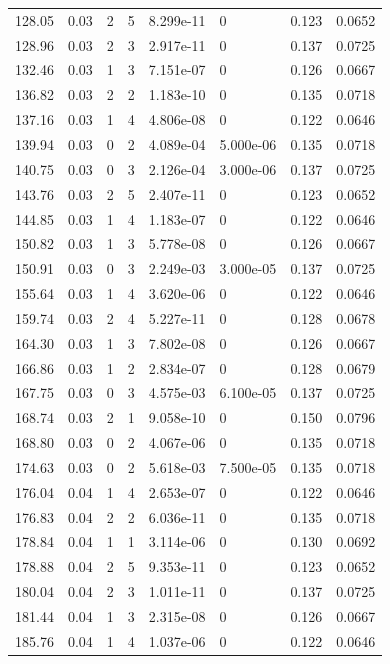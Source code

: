 \documentclass[preview]{standalone}
\begin{document}
{{{\begin{tabular}{L{1.2cm}C{1.2cm} C{0.3cm}C{0.5cm} C{1.4cm}C{1.4cm} C{1.4cm}C{1.4cm}}
  128.05  &  0.03  & 2     &  5 &  8.299e-11  & 0  & 0.123 &  0.0652   \\ 
  128.96  &  0.03  & 2     &  3 &  2.917e-11  & 0  & 0.137 &  0.0725   \\ 
  132.46  &  0.03  & 1     &  3 &  7.151e-07  & 0  & 0.126 &  0.0667   \\ 
  136.82  &  0.03  & 2     &  2 &  1.183e-10  & 0  & 0.135 &  0.0718   \\ 
  137.16  &  0.03  & 1     &  4 &  4.806e-08  & 0  & 0.122 &  0.0646   \\ 
  139.94  &  0.03  & 0     &  2 &  4.089e-04  & 5.000e-06  & 0.135 &  0.0718   \\ 
  140.75  &  0.03  & 0     &  3 &  2.126e-04  & 3.000e-06  & 0.137 &  0.0725   \\ 
  143.76  &  0.03  & 2     &  5 &  2.407e-11  & 0  & 0.123 &  0.0652   \\ 
  144.85  &  0.03  & 1     &  4 &  1.183e-07  & 0  & 0.122 &  0.0646   \\ 
  150.82  &  0.03  & 1     &  3 &  5.778e-08  & 0  & 0.126 &  0.0667   \\ 
  150.91  &  0.03  & 0     &  3 &  2.249e-03  & 3.000e-05  & 0.137 &  0.0725   \\ 
  155.64  &  0.03  & 1     &  4 &  3.620e-06  & 0  & 0.122 &  0.0646   \\ 
  159.74  &  0.03  & 2     &  4 &  5.227e-11  & 0  & 0.128 &  0.0678   \\ 
  164.30  &  0.03  & 1     &  3 &  7.802e-08  & 0  & 0.126 &  0.0667   \\ 
  166.86  &  0.03  & 1     &  2 &  2.834e-07  & 0  & 0.128 &  0.0679   \\ 
  167.75  &  0.03  & 0     &  3 &  4.575e-03  & 6.100e-05  & 0.137 &  0.0725   \\ 
  168.74  &  0.03  & 2     &  1 &  9.058e-10  & 0  & 0.150 &  0.0796   \\ 
  168.80  &  0.03  & 0     &  2 &  4.067e-06  & 0  & 0.135 &  0.0718   \\ 
  174.63  &  0.03  & 0     &  2 &  5.618e-03  & 7.500e-05  & 0.135 &  0.0718   \\ 
  176.04  &  0.04  & 1     &  4 &  2.653e-07  & 0  & 0.122 &  0.0646   \\ 
  176.83  &  0.04  & 2     &  2 &  6.036e-11  & 0  & 0.135 &  0.0718   \\ 
  178.84  &  0.04  & 1     &  1 &  3.114e-06  & 0  & 0.130 &  0.0692   \\ 
  178.88  &  0.04  & 2     &  5 &  9.353e-11  & 0  & 0.123 &  0.0652   \\ 
  180.04  &  0.04  & 2     &  3 &  1.011e-11  & 0  & 0.137 &  0.0725   \\ 
  181.44  &  0.04  & 1     &  3 &  2.315e-08  & 0  & 0.126 &  0.0667   \\ 
  185.76  &  0.04  & 1     &  4 &  1.037e-06  & 0  & 0.122 &  0.0646   \\ 
\hline 
\end{tabular} 

}}}
\end{document}
